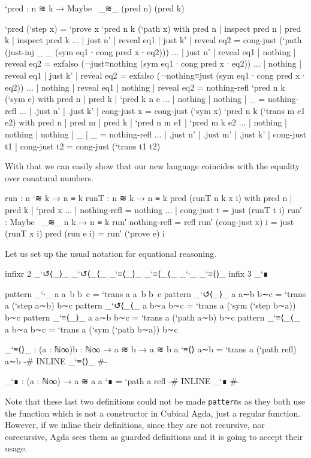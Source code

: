 \begin{code}
`pred : n ≋ k → Maybe~ _≋_ (pred n) (pred k)
\end{code}
\begin{code}[hide]
`pred (`step x) = `prove x
`pred {n} {k} (`path x) with pred n | inspect pred n | pred k | inspect pred k
... | just n' | reveal eq1 | just k' | reveal eq2 = cong-just (`path (just-inj _ _ (sym eq1 ∙ cong pred x ∙ eq2)))
... | just n' | reveal eq1 | nothing | reveal eq2 = exfalso (¬just≡nothing (sym eq1 ∙ cong pred x ∙ eq2))
... | nothing | reveal eq1 | just k' | reveal eq2 = exfalso (¬nothing≡just (sym eq1 ∙ cong pred x ∙ eq2))
... | nothing | reveal eq1 | nothing | reveal eq2 = nothing-refl
`pred {n} {k} (`sym e) with pred n | pred k | `pred {k} {n} e
... | nothing  | nothing  | _ = nothing-refl
... | .just n' | .just k' | cong-just x = cong-just (`sym x)
`pred {n} {k} (`trans {m} e1 e2) with pred n | pred m | pred k | `pred {n} {m} e1 | `pred {m} {k} e2
... | nothing  | nothing  | nothing  | _  | _  = nothing-refl
... | .just n' | .just m' | .just k' | cong-just t1 | cong-just t2 = cong-just (`trans t1 t2)
\end{code}

With that we can easily show that our new language coincides with the equality over conatural numbers.

\begin{code}
run : n `≋ k → n ≡ k
runT : n ≋ k → n ≡ k
pred (runT {n} {k} x i) with {pred n} | {pred k} | `pred x
... | nothing-refl = nothing
... | cong-just t = just (runT t i)
run′ : Maybe~ _≋_ n k → n ≡ k
run′ nothing-refl = refl
run′ (cong-just x) i = just (runT x i)
pred (run e i) = run′ (`prove e) i
\end{code}

Let us set up the usual notation for equational reasoning.

\begin{code}[hide]
infixr 2 _`↺⟨_⟩_ _`↺⟨_⟨_ _`≡⟨_⟩_ _`≡⟨_⟨_ _`∙_ _`≡⟨⟩_
infix  3 _`∎
\end{code}
\begin{code}
pattern _`∙_  {a} a~b b~c = `trans {a} a~b b~c
pattern _`↺⟨_⟩_ a a∼b b∼c = `trans {a} (`step a∼b) b∼c
pattern _`↺⟨_⟨_ a b∼a b∼c = `trans {a} (`sym (`step b∼a)) b∼c
pattern _`≡⟨_⟩_ a a∼b b∼c = `trans {a} (`path a∼b) b∼c
pattern _`≡⟨_⟨_ a b∼a b∼c = `trans {a} (`sym (`path b∼a)) b∼c

_`≡⟨⟩_ : (a : ℕ∞){b : ℕ∞} → a ≋ b → a ≋ b
a `≡⟨⟩ a∼b = `trans {a} (`path refl) a∼b
{-# INLINE _`≡⟨⟩_ #-}

_`∎ : (a : ℕ∞) → a ≋ a
a `∎ = `path {a} refl
{-# INLINE _`∎ #-}
\end{code}

Note that these last two definitions could not be made \texttt{pattern}s
as they both use the  function which is not a constructor
in Cubical Agda, just a regular function. However, if we inline their definitions,
since they are not recursive, nor corecursive, Agda sees them as guarded definitions
and it is going to accept their usage.
